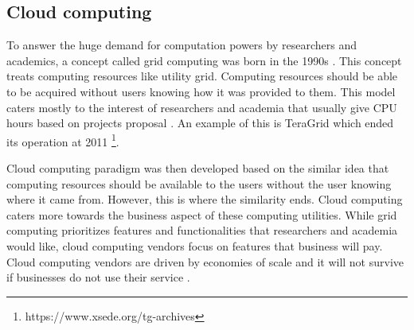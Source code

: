 %



\subsection{Cloud computing}


To answer the huge demand for computation powers by researchers and academics,  a concept called grid computing was born in the 1990s \citep{berman2003grid, foster2003grid}. This concept treats computing resources like utility grid. Computing resources should be able to be acquired without users knowing how it was provided to them. This model caters mostly to the interest of researchers and academia that usually give CPU hours based on projects proposal \citep{foster2008cloud}. An example of this is TeraGrid which ended its operation at 2011 \footnote{https://www.xsede.org/tg-archives}.

Cloud computing paradigm was then developed based on the similar idea that computing resources should be available to the users without the user knowing where it came from. However, this is where the similarity ends. Cloud computing caters more towards the business aspect of these computing utilities. While grid computing prioritizes features and functionalities that researchers and academia would like, cloud computing vendors focus on features that business will pay. Cloud computing vendors are driven by economies of scale and it will not survive if businesses do not use their service \citep{foster2008cloud}.

